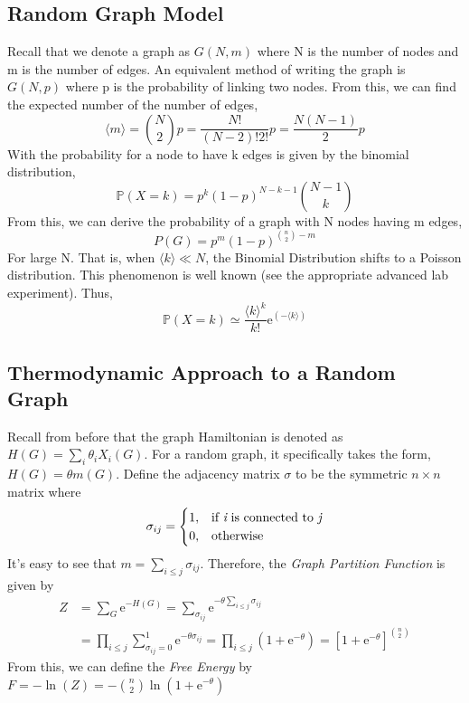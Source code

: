 \documentclass{article}
\begin{document}
\subsection{Random Graph Model}
Recall that we denote a graph as $G(N,m)$ where N is the number of nodes and m is the number of edges. An equivalent method of writing the graph is $G(N,p)$ where p is the probability of linking two nodes. From this, we can find the expected number of the number of edges,
$$\langle m \rangle = {N \choose 2} p = \frac{N!}{(N-2)!2!}p = \frac{N(N-1)}{2}p$$
With the probability for a node to have k edges is given by the binomial distribution,
$$\mathbb{P}(X=k) = p^k(1-p)^{N-k-1}{N-1 \choose k} $$
From this, we can derive the probability of a graph with N nodes having m edges,
$$P(G) = p^m (1-p)^{{n \choose 2}-m}$$
For large N. That is, when $\langle k \rangle \ll N$, the Binomial Distribution shifts to a Poisson distribution. This phenomenon is well known (see the appropriate advanced lab experiment). Thus,
$$\mathbb{P}(X=k) \simeq \frac{\langle k \rangle ^k}{k!}\text{e}^{(-\langle k \rangle )} $$

\subsection{Thermodynamic Approach to a Random Graph}

Recall from before that the graph Hamiltonian is denoted as $H(G) = \sum_i\theta_iX_i(G)$. For a random graph, it specifically takes the form, $H(G) = \theta m(G)$.
Define the adjacency matrix $\sigma$ to be the symmetric $n\times n$ matrix where 
$$\sigma_{ij} = \begin{cases}
			1, & \text{if {\it i} is connected to {\it j}} \\
			0, & \text{otherwise}
			\end{cases}
			$$
It's easy to see that $m = \sum_{i \leq j} \sigma_{ij}$.
Therefore, the {\it Graph Partition Function} is given by 
\begin{align*}
Z &= \sum_{G} \text{e}^{-H(G)} = \sum_{ \sigma_{ij}} \text{e}^{-\theta \sum_{i \leq j} \sigma_{ij}} \\
&= \prod_{i \leq j} \sum_{\sigma_{ij}=0}^1 \text{e}^{-\theta \sigma_{ij}} = \prod_{i \leq j} \left(1 + \text{e}^{-\theta}\right) = \left[1+\text{e}^{-\theta}\right]^{{n \choose 2}}
\end{align*}
From this, we can define the {\it Free Energy} by $F = -\ln(Z) = -{n \choose 2} \ln(1+\text{e}^{-\theta})$
\end{document}
